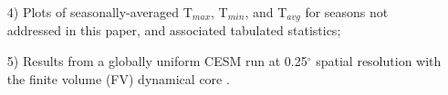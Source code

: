 \documentclass[ms]{agutexSI}
\begin{document}
\begin{article}
\begin{itemize}
\item[4)] Plots of seasonally-averaged T$_{max}$, T$_{min}$, and T$_{avg}$ for seasons not addressed in this paper, and associated tabulated statistics;

\item[5)] Results from a globally uniform CESM run at 0.25$^\circ$ spatial resolution with the finite volume (FV) dynamical core \citep{wehner2014effect}.
\end{itemize}


%








%
%



\end{article}
\end{document}
